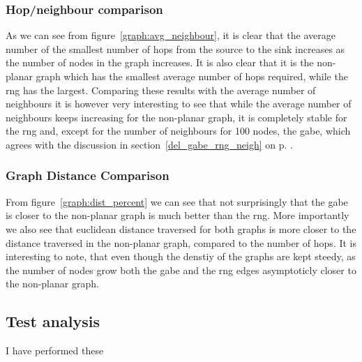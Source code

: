 \subsubsection{Hop/neighbour comparison}
\label{section:hop_neighbour_comparison}

As we can see from figure~\ref{graph:avg_neighbour}, it is clear that the average number of the smallest number of hops from the source to the sink increases as the number of nodes in the graph increases. It is also clear that it is the non-planar graph which has the smallest average number of hops required, while the \ac{rng} has the largest. Comparing these results with the average number of neighbours it is however very interesting to see that while the average number of neighbours keeps increasing for the non-planar graph, it is completely stable for the \ac{rng} and, except for the number of neighbours for 100 nodes, the \ac{gabe}, which agrees with the discussion in section~\ref{del_gabe_rng_neigh} on p. \pageref{del_gabe_rng_neigh}. 

\subsubsection{Graph Distance Comparison}
\label{section:graph_distance_comparison}


From figure~\ref{graph:dist_percent} we can see that not surprisingly that the \ac{gabe} is closer to the non-planar graph is much better than the \ac{rng}. More importantly we also see that euclidean distance traversed for both graphs is more closer to the distance traversed in the non-planar graph, compared to the number of hops. It is interesting to note, that even though the denstiy of the graphs are kept steedy, as the number of nodes grow both the \ac{gabe} and the \ac{rng} edges asymptoticly closer to the non-planar graph. 

\subsection{}







\subsection{Test analysis}


I have performed these


\subsection{}
\label{section:test_results_spanners}
